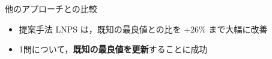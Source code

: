 \documentclass[11pt,dvipdfmx]{beamer}
\begin{document}
\begin{frame}{他のアプローチとの比較}
  \begin{center}
  \begin{tableB}
    
  \end{tableB}
  \end{center}
  \begin{itemize}
      \item 提案手法 LNPS は，既知の最良値との比を +26\% まで大幅に改善
      \item 1問について，\alert{\bf 既知の最良値を更新}することに成功
  \end{itemize}
\end{frame}
\end{document}
